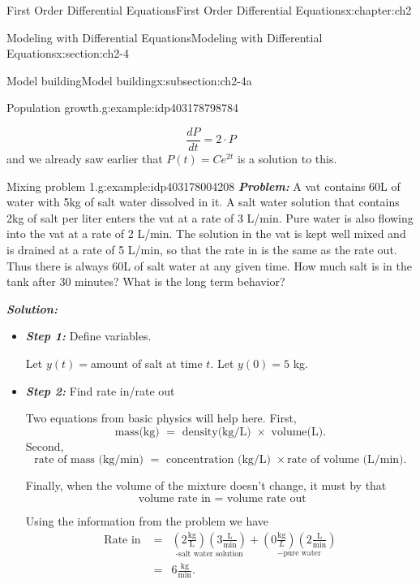 \documentclass[oneside,10pt,]{book}
\newcommand{\alert}[1]{\textbf{\textit{#1}}}
\numberwithin{equation}{section}
\numberwithin{equation}{section}
\newcommand{\amp}{&}
\begin{document}
\begin{chapterptx}{First Order Differential Equations}{}{First Order Differential Equations}{}{}{x:chapter:ch2}
\begin{sectionptx}{Modeling with Differential Equations}{}{Modeling with Differential Equations}{}{}{x:section:ch2-4}
\begin{subsectionptx}{Model building}{}{Model building}{}{}{x:subsection:ch2-4a}
\begin{example}{Population growth.}{g:example:idp403178798784}
\begin{itemize}[label=\textbullet]
\begin{equation*}
\frac{dP}{dt}=2\cdot P
\end{equation*}
and we already saw earlier that \(P(t)=Ce^{2t}\) is a solution to this.%
\end{itemize}
\end{example}
\begin{example}{Mixing problem 1.}{g:example:idp403178004208}%
\alert{Problem:} A vat contains 60L of water with 5kg of salt water dissolved in it. A salt water solution that contains 2kg of salt per liter enters the vat at a rate of 3 L\slash{}min. Pure water is also flowing into the vat at a rate of 2 L\slash{}min. The solution in the vat is kept well mixed and is drained at a rate of 5 L\slash{}min, so that the rate in is the same as the rate out. Thus there is always 60L of salt water at any given time. How much salt is in the tank after 30 minutes? What is the long term behavior?%
\par
\alert{Solution:}%
%
\begin{itemize}[label=\textbullet]
\item{}\alert{Step 1:} Define variables.%
\par
Let \(y(t)=\)amount of salt at time \(t\). Let \(y(0)=5\) kg.%
\item{}\alert{Step 2:} Find rate in\slash{}rate out%
\par
Two equations from basic physics will help here. First,%
\begin{equation*}
\text{mass(kg) } = \text{ density(kg/L) } \times \text{ volume(L)}.
\end{equation*}
Second,%
\begin{equation*}
\text{rate of mass (kg/min) } = \text{ concentration (kg/L) } \times \text{rate of volume (L/min)}.
\end{equation*}
%
\par
Finally, when the volume of the mixture doesn't change, it must by that%
\begin{equation*}
\text{ volume rate in } = \text{ volume rate out}
\end{equation*}
%
\par
Using the information from the problem we have%
\begin{align*}
\mbox{Rate in } \amp = \amp \underset{\mbox{-salt water solution}}{\left(2\frac{\mbox{kg}}{\mbox{L}}\right)\left(3\frac{\mbox{L}}{\mbox{min}}\right)}+\underset{-\mbox{pure water}}{\left(0\frac{\mbox{kg}}{L}\right)\left(2\frac{\mbox{L}}{\mbox{min}}\right)}\\
\amp = \amp 6\frac{\mbox{kg}}{\mbox{min}}.
\end{align*}

\end{itemize}
\end{example}
\end{subsectionptx}
\end{sectionptx}
\end{chapterptx}
\end{document}
